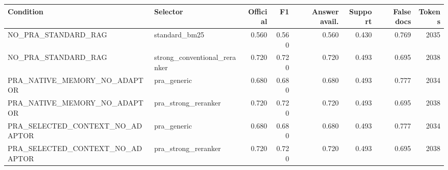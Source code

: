 \begin{tabular}{llrrrrrr}
\toprule
Condition & Selector & Official & F1 & Answer avail. & Support & False docs & Tokens \\
\midrule
NO\_PRA\_STANDARD\_RAG & standard\_bm25 & 0.560 & 0.560 & 0.560 & 0.430 & 0.769 & 2035 \\
NO\_PRA\_STANDARD\_RAG & strong\_conventional\_reranker & 0.720 & 0.720 & 0.720 & 0.493 & 0.695 & 2038 \\
PRA\_NATIVE\_MEMORY\_NO\_ADAPTOR & pra\_generic & 0.680 & 0.680 & 0.680 & 0.493 & 0.777 & 2034 \\
PRA\_NATIVE\_MEMORY\_NO\_ADAPTOR & pra\_strong\_reranker & 0.720 & 0.720 & 0.720 & 0.493 & 0.695 & 2038 \\
PRA\_SELECTED\_CONTEXT\_NO\_ADAPTOR & pra\_generic & 0.680 & 0.680 & 0.680 & 0.493 & 0.777 & 2034 \\
PRA\_SELECTED\_CONTEXT\_NO\_ADAPTOR & pra\_strong\_reranker & 0.720 & 0.720 & 0.720 & 0.493 & 0.695 & 2038 \\
\bottomrule
\end{tabular}
